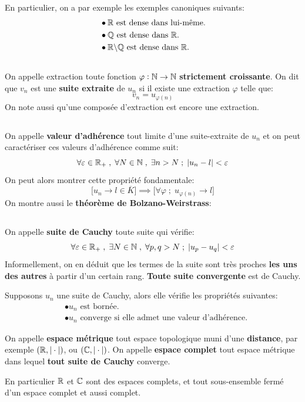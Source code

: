 En particulier, on a par exemple les exemples canoniques suivants:
\begin{align*}
    &\bullet \text{\(\mathbb{R}\) est dense dans lui-même}.\\
    &\bullet \text{\(\mathbb{Q}\) est dense dans \(\mathbb{R}\)}.\\
    &\bullet \text{\(\mathbb{R}\backslash \mathbb{Q}\) est dense dans \(\mathbb{R}\)}.
\end{align*}

\subsection*{}
On appelle extraction toute fonction \(\varphi : \mathbb{N} \rightarrow \mathbb{N}\) \textbf{strictement croissante}.\+
On dit que \(v_n\) est une \textbf{suite extraite} de \(u_n\) si il existe une extraction \(\varphi\) telle que:
\[
    v_n = u_{\varphi(n)}
\]
On note aussi qu'une composée d'extraction est encore une extraction.
\subsection*{}
On appelle \textbf{valeur d'adhérence} tout limite d'une suite-extraite de \(u_n\) et on peut caractériser ces valeurs d'adhérence comme suit:
\[
    \forall \varepsilon \in \mathbb{R}_+ \; , \; \forall N \in \mathbb{N} \; , \; \exists n > N \; ; \; |u_n - l| < \varepsilon 
\]
On peut alors montrer cette propriété fondamentale:
\[
    \Bigr[u_n \rightarrow l \in \overline{K} \Bigr] \implies \Bigr[ \forall \varphi \; ; \; u_{\varphi(n)} \rightarrow l \Bigr]
\]
On montre aussi le \textbf{théorème de Bolzano-Weirstrass}:
\begin{center}
\end{center}

\subsection*{}
On appelle \textbf{suite de Cauchy} toute suite qui vérifie:
\[
    \forall \varepsilon \in \mathbb{R}_+ \; , \; \exists N \in \mathbb{N} \; , \; \forall p, q > N \; ; \; |u_p - u_q| < \varepsilon 
\]
Informellement, on en déduit que les termes de la suite sont très proches \textbf{les uns des autres} à partir d'un certain rang.\+
\textbf{Toute suite convergente} est de Cauchy.\<

Supposons \(u_n\) une suite de Cauchy, alors elle vérifie les propriétés suivantes:
\begin{align*}
    &\bullet u_n \text{ est bornée.} \\
    &\bullet u_n \text{ converge si elle admet une valeur d'adhérence.}
\end{align*}

On appelle \textbf{espace métrique} tout espace topologique muni d'une \textbf{distance}, par exemple \((\mathbb{R}, |\cdot|)\), ou \((\mathbb{C}, |\cdot|)\).\+
On appelle \textbf{espace complet} tout espace métrique dans lequel \textbf{tout suite de Cauchy} converge.\<

En particulier \(\mathbb{R}\) et \(\mathbb{C}\) sont des espaces complets, et tout sous-ensemble fermé d'un espace complet et aussi complet. \<

